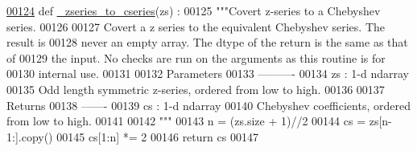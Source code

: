\begin{DoxyCode}
\hypertarget{namespacepyneb_1_1utils_1_1chebyshev_l00124}{}\hyperlink{namespacepyneb_1_1utils_1_1chebyshev_a2a88474ce0ea12fb26f82b7116752dc1}{00124} \textcolor{keyword}{def }\hyperlink{namespacepyneb_1_1utils_1_1chebyshev_a2a88474ce0ea12fb26f82b7116752dc1}{\_zseries\_to\_cseries}(zs) :
00125     \textcolor{stringliteral}{"""Covert z-series to a Chebyshev series.}
00126 \textcolor{stringliteral}{}
00127 \textcolor{stringliteral}{    Covert a z series to the equivalent Chebyshev series. The result is}
00128 \textcolor{stringliteral}{    never an empty array. The dtype of the return is the same as that of}
00129 \textcolor{stringliteral}{    the input. No checks are run on the arguments as this routine is for}
00130 \textcolor{stringliteral}{    internal use.}
00131 \textcolor{stringliteral}{}
00132 \textcolor{stringliteral}{    Parameters}
00133 \textcolor{stringliteral}{    ----------}
00134 \textcolor{stringliteral}{    zs : 1-d ndarray}
00135 \textcolor{stringliteral}{        Odd length symmetric z-series, ordered from  low to high.}
00136 \textcolor{stringliteral}{}
00137 \textcolor{stringliteral}{    Returns}
00138 \textcolor{stringliteral}{    -------}
00139 \textcolor{stringliteral}{    cs : 1-d ndarray}
00140 \textcolor{stringliteral}{        Chebyshev coefficients, ordered from  low to high.}
00141 \textcolor{stringliteral}{}
00142 \textcolor{stringliteral}{    """}
00143     n = (zs.size + 1)//2
00144     cs = zs[n-1:].copy()
00145     cs[1:n] *= 2
00146     \textcolor{keywordflow}{return} cs
00147 
\end{DoxyCode}
\hypertarget{namespacepyneb_1_1utils_1_1chebyshev_a640344fc14aa36e14d0e93eba4411188}{}
